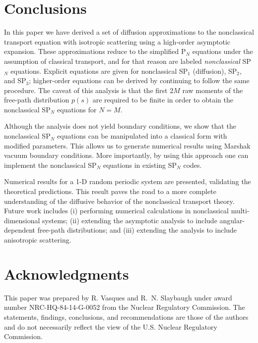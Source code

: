 \documentclass{anstrans}
\begin{document}
\section{Conclusions}
In this paper we have derived a set of diffusion approximations to the nonclassical transport equation with isotropic scattering using a high-order asymptotic expansion.
These approximations reduce to the simplified P$_N$ equations under the assumption of classical transport, and for that reason are labeled \textit{nonclassical} SP$_N$ equations.
Explicit equations are given for nonclassical SP$_1$ (diffusion), SP$_2$, and SP$_3$; higher-order equations can be derived by continuing to follow the same procedure.
The caveat of this analysis is that the first $2M$ raw moments of the free-path distribution $p(s)$ are required to be finite in order to obtain the nonclassical SP$_N$ equations for $N=M$.

Although the analysis does not yield boundary conditions, we show that the nonclassical SP$_N$ equations can be manipulated into a classical form with modified parameters.
This allows us to generate numerical results using Marshak vacuum boundary conditions.
More importantly, by using this approach one can implement the nonclassical SP$_N$ equations in existing SP$_N$ codes.

Numerical results for a 1-D random periodic system are presented, validating the theoretical predictions.
This result paves the road to a more complete understanding of the diffusive behavior of the nonclassical transport theory.
Future work includes (i) performing numerical calculations in nonclassical multi-dimensional systems; (ii) extending the asymptotic analysis to include angular-dependent free-path distributions; and (iii) extending the analysis to include anisotropic scattering.

\section{Acknowledgments}
This paper was prepared by R. Vasques and R.~N. Slaybaugh under award number NRC-HQ-84-14-G-0052 from the Nuclear Regulatory Commission.
The statements, findings, conclusions, and recommendations are those of the authors and do not necessarily reflect the view of the U.S. Nuclear Regulatory Commission.



\end{document}
